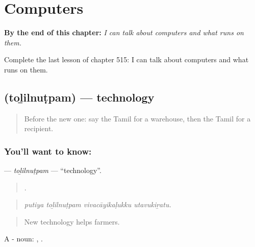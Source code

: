
\chapter{Computers}
\label{ch:ta-computers}

\begin{chapteropening}
\textbf{By the end of this chapter:} \emph{I can talk about computers and what runs on them.}

Complete the last lesson of chapter 515: I can talk about computers and what runs on them.
\end{chapteropening}

\section[\texorpdfstring{\ta{தொழில்நுட்பம்} (toḻilnuṭpam)}{தொழில்நுட்பம் (toḻilnuṭpam)}]{ (toḻilnuṭpam) — technology}

\label{lesson:TA-C515-tolilnutpam}



\begin{quote}
Before the new one: say the Tamil for a warehouse, then the Tamil for a recipient.
\end{quote}

\subsection*{You'll want to know: }
\textbf{} — \emph{toḻilnuṭpam} — \textquotedblleft{}technology\textquotedblright{}.

\begin{quote}
   .
\end{quote}

\begin{quote}
\emph{putiya toḻilnuṭpam vivacāyikaḷukku utavukiṟatu.}
\end{quote}

\begin{quote}
New technology helps farmers.
\end{quote}

A - noun: , .


